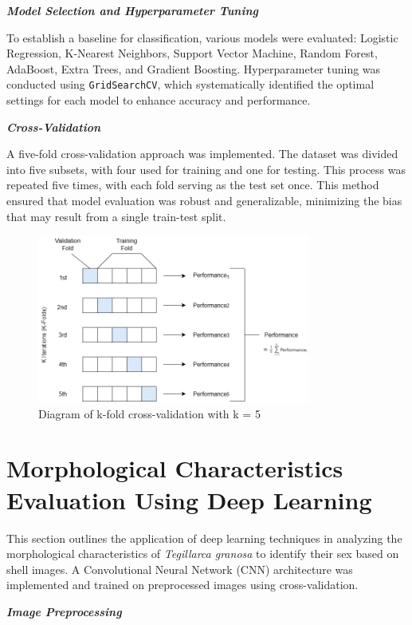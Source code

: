 \textbf{\textit{Model Selection and Hyperparameter Tuning}}

To establish a baseline for classification, various models were evaluated: Logistic Regression, K-Nearest Neighbors, Support Vector Machine, Random Forest, AdaBoost, Extra Trees, and Gradient Boosting. Hyperparameter tuning was conducted using \texttt{GridSearchCV}, which systematically identified the optimal settings for each model to enhance accuracy and performance.

\textbf{\textit{Cross-Validation}}

A five-fold cross-validation approach was implemented. The dataset was divided into five subsets, with four used for training and one for testing. This process was repeated five times, with each fold serving as the test set once. This method ensured that model evaluation was robust and generalizable, minimizing the bias that may result from a single train-test split. \cite{geeksforgeeks2024}

\begin{figure}[!htbp]
	\centering
	\includegraphics[width=0.8\textwidth]{figures/cv.png}
	\caption{Diagram of k-fold cross-validation with k = 5}
	\label{fig: cv}
\end{figure}

\section{Morphological Characteristics Evaluation Using Deep Learning}
This section outlines the application of deep learning techniques in analyzing the morphological characteristics of \textit{Tegillarca granosa} to identify their sex based on shell images. A Convolutional Neural Network (CNN) architecture was implemented and trained on preprocessed images using cross-validation.

\textbf{\textit{Image Preprocessing}}

